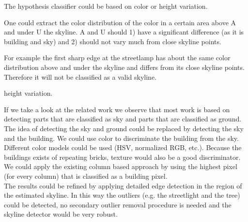 The hypothesis classifier could be based on color or height variation.

One could extract the color distribution of the color in a certain area above
A and under U the skyline. 
A and U should 1) have a significant difference (as it is building and sky) 
and 2) should not vary much from close skyline points.

For example the first sharp edge at the streetlamp has about the same color distribution
above and under the skyline and differs from its close skyline points.
Therefore it will not be classified as a valid skyline.

height variation.



If we take a look at the related work we observe that most work is based on
detecting parts that are classified as sky and parts that are classified as
ground. The idea of detecting the sky and ground could be replaced by detecting
the sky and the building. We could use color to discriminate the building from
the sky. Different color models could be used (HSV, normalized RGB, etc.).
Because the buildings exists of repeating bricks, texture would also be a good
discriminator. We could apply the existing column based approach by using the
highest pixel (for every column) that is classified as a building pixel.\\

The results could be refined by applying detailed edge detection in the region of
the estimated skyline. In this way the outliers (e.g. the streetlight and the
tree) could be detected, no secondary outlier removal procedure is needed and
the skyline detector would be very robust.




